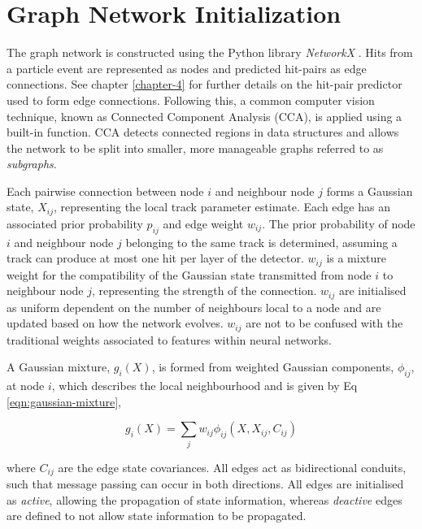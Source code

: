 \section{Graph Network Initialization}
\label{gnn-network-initialization}

The graph network is constructed using the Python library \textit{NetworkX} \cite{SciPyProceedings_11}. Hits from a particle event are represented as nodes and predicted hit-pairs as edge connections. See chapter \ref{chapter-4} for further details on the hit-pair predictor used to form edge connections. Following this, a common computer vision technique, known as Connected Component Analysis (CCA), is applied using a built-in function\cite{networkx}. CCA detects connected regions in data structures and allows the network to be split into smaller, more manageable graphs referred to as \textit{subgraphs}. 

Each pairwise connection between node $i$ and neighbour node $j$ forms a Gaussian state, $X_{ij}$, representing the local track parameter estimate. Each edge has an associated prior probability $p_{ij}$ and edge weight $w_{ij}$. The prior probability of node $i$ and neighbour node $j$ belonging to the same track is determined, assuming a track can produce at most one hit per layer of the detector. $w_{ij}$ is a mixture weight for the compatibility of the Gaussian state transmitted from node $i$ to neighbour node $j$, representing the strength of the connection. $w_{ij}$ are initialised as uniform dependent on the number of neighbours local to a node and are updated based on how the network evolves. $w_{ij}$ are not to be confused with the traditional weights associated to features within neural networks.

A Gaussian mixture, $g_i(X)$, is formed from weighted Gaussian components, $\phi_{ij}$, at node $i$, which describes the local neighbourhood and is given by Eq \eqref{eqn:gaussian-mixture},

\begin{equation}
g_i(X) = \sum_{j} w_{ij}\phi_{ij}(X, X_{ij}, C_{ij})
\label{eqn:gaussian-mixture}
\end{equation}

where $C_{ij}$ are the edge state covariances. All edges act as bidirectional conduits, such that message passing can occur in both directions. All edges are initialised as \textit{active}, allowing the propagation of state information, whereas \textit{deactive} edges are defined to not allow state information to be propagated. 


